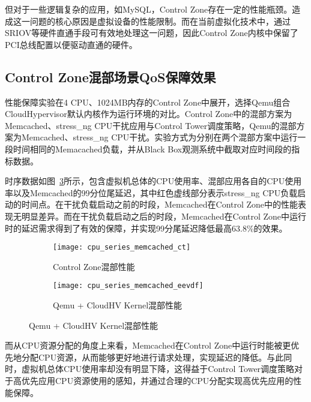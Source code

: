 但对于一些逻辑复杂的应用，如MySQL，Control Zone存在一定的性能瓶颈。造成这一问题的核心原因是虚拟设备的性能限制。而在当前虚拟化技术中，通过SRIOV等硬件直通手段可有效地处理这一问题，因此Control Zone内核中保留了PCI总线配置以便驱动直通的硬件。

\subsection{Control Zone混部场景QoS保障效果}

性能保障实验在4 CPU、1024MB内存的Control Zone中展开，选择Qemu组合CloudHypervisor默认内核作为运行环境的对比。Control Zone中的混部方案为Memcached、stress\_ng CPU干扰应用与Control Tower调度策略，Qemu的混部方案为Memcached、stress\_ng CPU干扰。实验方式为分别在两个混部方案中运行一段时间相同的Memacached负载，并从Black Box观测系统中截取对应时间段的指标数据。

时序数据如图~\ref{fig:cpu_series_memcached}所示，包含虚拟机总体的CPU使用率、混部应用各自的CPU使用率以及Memcached的99分位尾延迟，其中红色虚线部分表示stress\_ng CPU负载启动的时间点。在干扰负载启动之前的时段，Memcached在Control Zone中的性能表现无明显差异。而在干扰负载启动之后的时段，Memcached在Control Zone中运行时的延迟需求得到了有效的保障，并实现99分尾延迟降低最高63.8\%的效果。

\begin{figure}[H]
    \centering
    \begin{subfigure}[b]{0.49\textwidth}
        \texttt{[image: cpu\_series\_memcached\_ct]}
        \caption{\quad Control Zone混部性能}
        \label{fig:cpu_series_memcached_ct}
    \end{subfigure}
    \begin{subfigure}[b]{0.49\textwidth}
        \texttt{[image: cpu\_series\_memcached\_eevdf]}
        \caption{\quad Qemu + CloudHV Kernel混部性能}
        \label{fig:cpu_series_memcached_eevdf}
    \end{subfigure}
    \label{fig:cpu_series_memcached}
\end{figure}

而从CPU资源分配的角度上来看，Memcached在Control Zone中运行时能被更优先地分配CPU资源，从而能够更好地进行请求处理，实现延迟的降低。与此同时，虚拟机总体CPU使用率却没有明显下降，这得益于Control Tower调度策略对于高优先应用CPU资源使用的感知，并通过合理的CPU分配实现高优先应用的性能保障。

